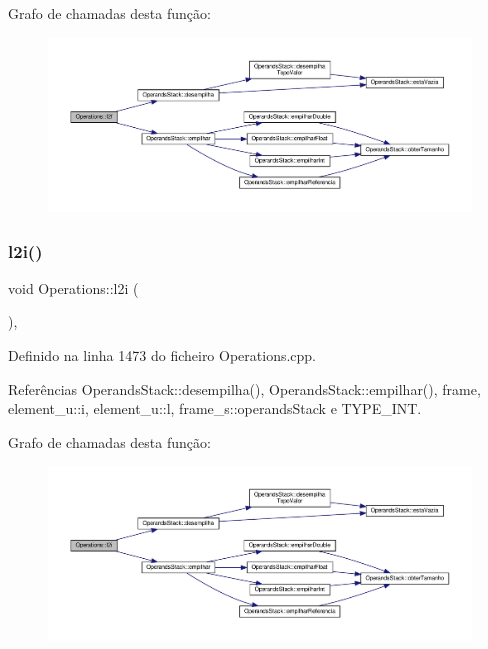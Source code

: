 Grafo de chamadas desta função\+:
\nopagebreak
\begin{figure}[H]
\begin{center}
\leavevmode
\includegraphics[width=350pt]{classOperations_af2064cce9ba6f6a4be257354f21f537e_cgraph}
\end{center}
\end{figure}
\mbox{\label{classOperations_ad5820d99e67f4856e110685b775c5e9b}} 
\subsubsection{\texorpdfstring{l2i()}{l2i()}}
{\footnotesize\ttfamily void Operations\+::l2i (\begin{DoxyParamCaption}{ }\end{DoxyParamCaption})\hspace{0.3cm}{\ttfamily [static]}, {\ttfamily [private]}}



Definido na linha 1473 do ficheiro Operations.\+cpp.



Referências Operands\+Stack\+::desempilha(), Operands\+Stack\+::empilhar(), frame, element\+\_\+u\+::i, element\+\_\+u\+::l, frame\+\_\+s\+::operands\+Stack e T\+Y\+P\+E\+\_\+\+I\+NT.

Grafo de chamadas desta função\+:
\nopagebreak
\begin{figure}[H]
\begin{center}
\leavevmode
\includegraphics[width=350pt]{classOperations_ad5820d99e67f4856e110685b775c5e9b_cgraph}
\end{center}
\end{figure}
\mbox{\label{classOperations_ad4b153d687baa98c26fcfe7c24e12f45}} 

